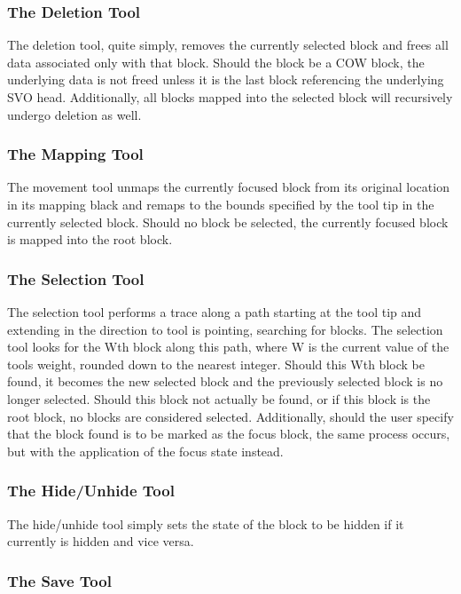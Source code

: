 \documentclass[onecolumn, draftclsnofoot,10pt, compsoc]{IEEEtran}
\begin{document}
\subsubsection{The Deletion Tool}

The deletion tool, quite simply, removes the currently selected block and frees all data associated only with that block. Should the block be a COW block, the underlying data is not freed unless it is the last block referencing the underlying SVO head. Additionally, all blocks mapped into the selected block will recursively undergo deletion as well.

\subsubsection{The Mapping Tool}

The movement tool unmaps the currently focused block from its original location in its mapping black and remaps to the bounds specified by the tool tip in the currently selected block. Should no block be selected, the currently focused block is mapped into the root block.

\subsubsection{The Selection Tool}

The selection tool performs a trace along a path starting at the tool tip and extending in the direction to tool is pointing, searching for blocks. The selection tool looks for the Wth block along this path, where W is the current value of the tools weight, rounded down to the nearest integer. Should this Wth block be found, it becomes the new selected block and the previously selected block is no longer selected. Should this block not actually be found, or if this block is the root block, no blocks are considered selected. Additionally, should the user specify that the block found is to be marked as the focus block, the same process occurs, but with the application of the focus state instead. 

\subsubsection{The Hide/Unhide Tool}

The hide/unhide tool simply sets the state of the block to be hidden if it currently is hidden and vice versa.

\subsubsection{The Save Tool}
\end{document}
